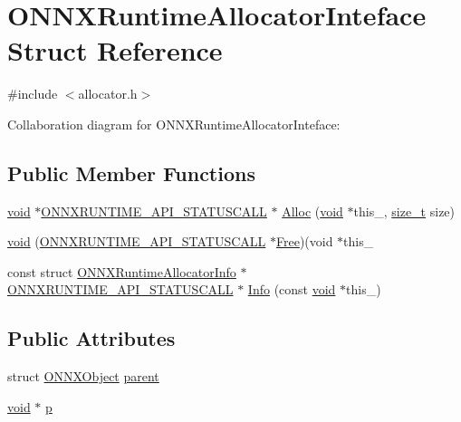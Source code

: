 \hypertarget{structONNXRuntimeAllocatorInteface}{}\section{O\+N\+N\+X\+Runtime\+Allocator\+Inteface Struct Reference}
\label{structONNXRuntimeAllocatorInteface}


{\ttfamily \#include $<$allocator.\+h$>$}



Collaboration diagram for O\+N\+N\+X\+Runtime\+Allocator\+Inteface\+:
\subsection*{Public Member Functions}
\begin{DoxyCompactItemize}
\item 
\mbox{\hyperlink{structONNXRuntimeAllocatorInteface_a54eabf966f0201ca7ad1be93fcf5f133}{void}} $\ast$\mbox{\hyperlink{error__code_8h_aeaeecdc9b792735c3e26fc0f9815c988}{O\+N\+N\+X\+R\+U\+N\+T\+I\+M\+E\+\_\+\+A\+P\+I\+\_\+\+S\+T\+A\+T\+U\+S\+C\+A\+LL}} $\ast$ \mbox{\hyperlink{structONNXRuntimeAllocatorInteface_a87c198fd69b56c2623890b82ec888446}{Alloc}} (\mbox{\hyperlink{structONNXRuntimeAllocatorInteface_a54eabf966f0201ca7ad1be93fcf5f133}{void}} $\ast$this\+\_\+, \mbox{\hyperlink{mlasi_8h_a503efbc1c6e50825320ad909366b78ab}{size\+\_\+t}} size)
\item 
\mbox{\hyperlink{structONNXRuntimeAllocatorInteface_a54eabf966f0201ca7ad1be93fcf5f133}{void}} (\mbox{\hyperlink{error__code_8h_aeaeecdc9b792735c3e26fc0f9815c988}{O\+N\+N\+X\+R\+U\+N\+T\+I\+M\+E\+\_\+\+A\+P\+I\+\_\+\+S\+T\+A\+T\+U\+S\+C\+A\+LL}} $\ast$\mbox{\hyperlink{default__cpu__allocator__c__api_8cc_a0a641453a140ac8ff8d71510ac74414c}{Free}})(void $\ast$this\+\_\+
\item 
const struct \mbox{\hyperlink{structONNXRuntimeAllocatorInfo}{O\+N\+N\+X\+Runtime\+Allocator\+Info}} $\ast$\mbox{\hyperlink{error__code_8h_aeaeecdc9b792735c3e26fc0f9815c988}{O\+N\+N\+X\+R\+U\+N\+T\+I\+M\+E\+\_\+\+A\+P\+I\+\_\+\+S\+T\+A\+T\+U\+S\+C\+A\+LL}} $\ast$ \mbox{\hyperlink{structONNXRuntimeAllocatorInteface_abec6c9a075d52bd7146cfab9c64b184e}{Info}} (const \mbox{\hyperlink{structONNXRuntimeAllocatorInteface_a54eabf966f0201ca7ad1be93fcf5f133}{void}} $\ast$this\+\_\+)
\end{DoxyCompactItemize}
\subsection*{Public Attributes}
\begin{DoxyCompactItemize}
\item 
struct \mbox{\hyperlink{structONNXObject}{O\+N\+N\+X\+Object}} \mbox{\hyperlink{structONNXRuntimeAllocatorInteface_abff01465e68ebe03e480dd1d48f42d84}{parent}}
\item 
\mbox{\hyperlink{structONNXRuntimeAllocatorInteface_a54eabf966f0201ca7ad1be93fcf5f133}{void}} $\ast$ \mbox{\hyperlink{structONNXRuntimeAllocatorInteface_a89e0d3beadbc69c26d69988290dabb67}{p}}
\end{DoxyCompactItemize}



